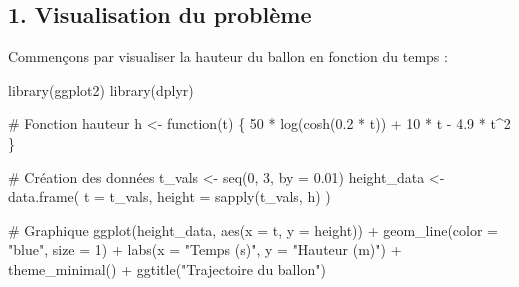 \documentclass[
  12pt,
  letterpaper,
]{book}
\newenvironment{Shaded}{}{}
\newcommand{\AttributeTok}[1]{\textcolor[rgb]{0.84,0.23,0.29}{#1}}
\newcommand{\CommentTok}[1]{\textcolor[rgb]{0.42,0.45,0.49}{#1}}
\newcommand{\ControlFlowTok}[1]{\textcolor[rgb]{0.84,0.23,0.29}{#1}}
\newcommand{\DecValTok}[1]{\textcolor[rgb]{0.00,0.36,0.77}{#1}}
\newcommand{\FloatTok}[1]{\textcolor[rgb]{0.00,0.36,0.77}{#1}}
\newcommand{\FunctionTok}[1]{\textcolor[rgb]{0.44,0.26,0.76}{#1}}
\newcommand{\NormalTok}[1]{\textcolor[rgb]{0.14,0.16,0.18}{#1}}
\newcommand{\OtherTok}[1]{\textcolor[rgb]{0.44,0.26,0.76}{#1}}
\newcommand{\SpecialCharTok}[1]{\textcolor[rgb]{0.00,0.36,0.77}{#1}}
\newcommand{\StringTok}[1]{\textcolor[rgb]{0.01,0.18,0.38}{#1}}
\theoremstyle{remark}
\begin{document}
\subsection{1. Visualisation du
problème}\label{visualisation-du-probluxe8me}

Commençons par visualiser la hauteur du ballon en fonction du temps :

\begin{Shaded}
\begin{Highlighting}[]
\FunctionTok{library}\NormalTok{(ggplot2)}
\FunctionTok{library}\NormalTok{(dplyr)}

\CommentTok{\# Fonction hauteur}
\NormalTok{h }\OtherTok{\textless{}{-}} \ControlFlowTok{function}\NormalTok{(t) \{}
  \DecValTok{50} \SpecialCharTok{*} \FunctionTok{log}\NormalTok{(}\FunctionTok{cosh}\NormalTok{(}\FloatTok{0.2} \SpecialCharTok{*}\NormalTok{ t)) }\SpecialCharTok{+} \DecValTok{10} \SpecialCharTok{*}\NormalTok{ t }\SpecialCharTok{{-}} \FloatTok{4.9} \SpecialCharTok{*}\NormalTok{ t}\SpecialCharTok{\^{}}\DecValTok{2}
\NormalTok{\}}

\CommentTok{\# Création des données}
\NormalTok{t\_vals }\OtherTok{\textless{}{-}} \FunctionTok{seq}\NormalTok{(}\DecValTok{0}\NormalTok{, }\DecValTok{3}\NormalTok{, }\AttributeTok{by =} \FloatTok{0.01}\NormalTok{)}
\NormalTok{height\_data }\OtherTok{\textless{}{-}} \FunctionTok{data.frame}\NormalTok{(}
  \AttributeTok{t =}\NormalTok{ t\_vals,}
  \AttributeTok{height =} \FunctionTok{sapply}\NormalTok{(t\_vals, h)}
\NormalTok{)}

\CommentTok{\# Graphique}
\FunctionTok{ggplot}\NormalTok{(height\_data, }\FunctionTok{aes}\NormalTok{(}\AttributeTok{x =}\NormalTok{ t, }\AttributeTok{y =}\NormalTok{ height)) }\SpecialCharTok{+}
  \FunctionTok{geom\_line}\NormalTok{(}\AttributeTok{color =} \StringTok{"blue"}\NormalTok{, }\AttributeTok{size =} \DecValTok{1}\NormalTok{) }\SpecialCharTok{+}
  \FunctionTok{labs}\NormalTok{(}\AttributeTok{x =} \StringTok{"Temps (s)"}\NormalTok{, }\AttributeTok{y =} \StringTok{"Hauteur (m)"}\NormalTok{) }\SpecialCharTok{+}
  \FunctionTok{theme\_minimal}\NormalTok{() }\SpecialCharTok{+}
  \FunctionTok{ggtitle}\NormalTok{(}\StringTok{"Trajectoire du ballon"}\NormalTok{)}
\end{Highlighting}
\end{Shaded}
\end{document}

